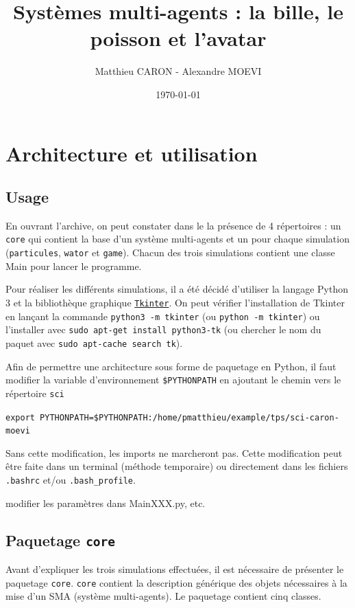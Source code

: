 \documentclass[a4paper]{article}
\title{Systèmes multi-agents : la bille, le poisson et l'avatar}
\author{Matthieu CARON - Alexandre MOEVI}
\date{\today}
\begin{document}
\maketitle

\section{Architecture et utilisation}

\subsection{Usage}

En ouvrant l'archive, on peut constater dans le la présence de 4 répertoires : un \texttt{core} qui contient la base d'un système multi-agents et un pour chaque simulation (\texttt{particules}, \texttt{wator} et \texttt{game}). Chacun des trois simulations contient une classe Main pour lancer le programme.

Pour réaliser les différents simulations, il a été décidé d'utiliser la langage Python 3 et la bibliothèque graphique \href{https://wiki.python.org/moin/TkInter}{\texttt{Tkinter}}. On peut vérifier l'installation de Tkinter en lançant la commande \texttt{python3 -m tkinter} (ou \texttt{python -m tkinter}) ou l'installer avec \texttt{sudo apt-get install python3-tk} (ou chercher le nom du paquet avec \texttt{sudo apt-cache search tk}).

\medskip
Afin de permettre une architecture sous forme de paquetage en Python, il faut modifier la variable d'environnement \texttt{\$PYTHONPATH} en ajoutant le chemin vers le répertoire \texttt{sci} 

\medskip
\texttt{export PYTHONPATH=\$PYTHONPATH:/home/pmatthieu/example/tps/sci-caron-moevi}

\medskip
Sans cette modification, les imports ne marcheront pas. Cette modification peut être faite dans un terminal (méthode temporaire) ou directement dans les fichiers \texttt{.bashrc} et/ou \texttt{.bash\_profile}.

\medskip
modifier les paramètres dans MainXXX.py, etc.

\subsection{Paquetage \texttt{core}}
Avant d'expliquer les trois simulations effectuées, il est nécessaire de présenter le paquetage \texttt{core}. \texttt{core} contient la description générique des objets nécessaires à la mise d'un SMA (système multi-agents). Le paquetage contient cinq classes.
 
\end{document}

